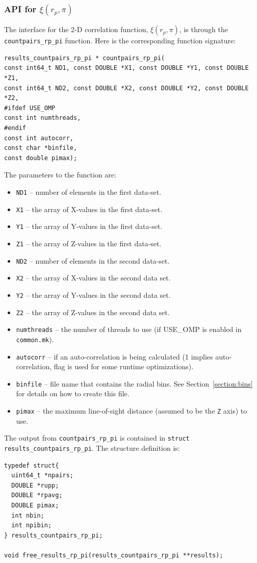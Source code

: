 \documentclass[12pt,titlepage]{article}
\newcommand{\xirppi}{\ensuremath{{\xi(r_p,\pi)}}\xspace}
\begin{document}
\subsubsection{API for \texorpdfstring{\xirppi}{xi(rp,pi)}}
The interface for the 2-D correlation function, \xirppi, is through the \texttt{countpairs\_rp\_pi} function. Here is 
the corresponding function signature:
\begin{lstlisting}[label={code:API_DDrppi},caption={API for the 2-D \xirppi}]
results_countpairs_rp_pi * countpairs_rp_pi(
const int64_t ND1, const DOUBLE *X1, const DOUBLE *Y1, const DOUBLE *Z1,
const int64_t ND2, const DOUBLE *X2, const DOUBLE *Y2, const DOUBLE *Z2,
#ifdef USE_OMP
const int numthreads,
#endif
const int autocorr,
const char *binfile,
const double pimax);
\end{lstlisting}

The parameters to the function are:
\begin{itemize}
\item \texttt{ND1} -- number of elements in the first data-set.
\item \texttt{X1}  -- the array of X-values in the first data-set.
\item \texttt{Y1}  -- the array of Y-values in the first data-set.
\item \texttt{Z1}  -- the array of Z-values in the first data-set.
\item \texttt{ND2} -- number of elements in the second data-set.
\item \texttt{X2}  -- the array of X-values in the second data set.
\item \texttt{Y2}  -- the array of Y-values in the second data set.
\item \texttt{Z2}  -- the array of Z-values in the second data set.
\item \texttt{numthreads} -- the number of threads to use (if USE\_OMP is enabled in \texttt{common.mk}).
\item \texttt{autocorr} -- if an auto-correlation is being calculated (1 implies auto-correlation, flag is used for some runtime optimizations).
\item \texttt{binfile} -- file name that contains the radial bins. See Section~\ref{section:bins} for details on how to create this file.
\item \texttt{pimax} -- the maximum line-of-sight distance (assumed to be the \texttt{Z} axis) to use. 
\end{itemize}

The output from \texttt{countpairs\_rp\_pi} is contained in \texttt{struct results\_countpairs\_rp\_pi}. The structure
definition is:
\begin{lstlisting}[label={code:API_DDrppi_struct},caption={Structure definition for the output of \xirppi}]
typedef struct{
  uint64_t *npairs;
  DOUBLE *rupp;
  DOUBLE *rpavg;
  DOUBLE pimax;
  int nbin;
  int npibin;
} results_countpairs_rp_pi;

void free_results_rp_pi(results_countpairs_rp_pi **results);
\end{lstlisting}
\end{document}
